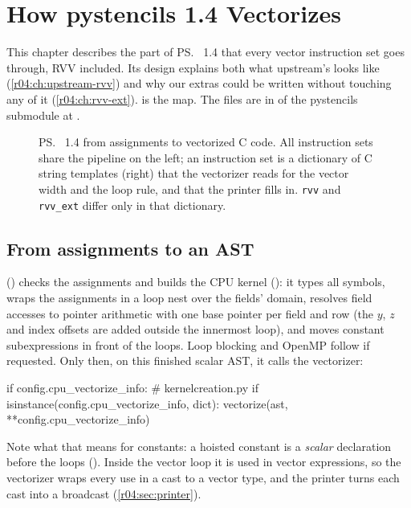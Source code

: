 \chapter{How pystencils 1.4 Vectorizes}\label{r04:ch:vectorizer}

This chapter describes the part of \ps{}~1.4 that every vector instruction set goes
through, RVV included. Its design explains both what upstream's  looks like
(\cref{r04:ch:upstream-rvv}) and why our extras could be written without touching any
of it (\cref{r04:ch:rvv-ext}).  is the map. The files are in
 of the pystencils submodule at .

\begin{figure}[htbp]
  \centering
  \resizebox{0.92\linewidth}{!}{}
  \caption[pystencils 1.4: from assignments to vectorized C code]{\ps{}~1.4 from
    assignments to vectorized C code. All instruction sets share the pipeline on the
    left; an instruction set is a dictionary of C string templates (right) that the
    vectorizer reads for the vector width and the loop rule, and that the printer fills
    in. \texttt{rvv} and \texttt{rvv\_ext} differ only in that dictionary.}
  \label{r04:fig:vectorizer}
\end{figure}

\section{From assignments to an AST}

 () checks the assignments and builds the
CPU kernel (): it types all symbols, wraps the assignments
in a loop nest over the fields' domain, resolves field accesses to pointer arithmetic
with one base pointer per field and row (the $y$, $z$ and index offsets are added
outside the innermost loop), and moves constant subexpressions in front of the loops.
Loop blocking and OpenMP follow if requested. Only then, on this finished scalar AST, it
calls the vectorizer:
\begin{pycode}
if config.cpu_vectorize_info:                                  # kernelcreation.py
    if isinstance(config.cpu_vectorize_info, dict):
        vectorize(ast, **config.cpu_vectorize_info)
\end{pycode}
Note what that means for constants: a hoisted constant is a \emph{scalar} declaration
before the loops (). Inside the vector loop it is used
in vector expressions, so the vectorizer wraps every use in a cast to a vector type,
and the printer turns each cast into a broadcast (\cref{r04:sec:printer}).

